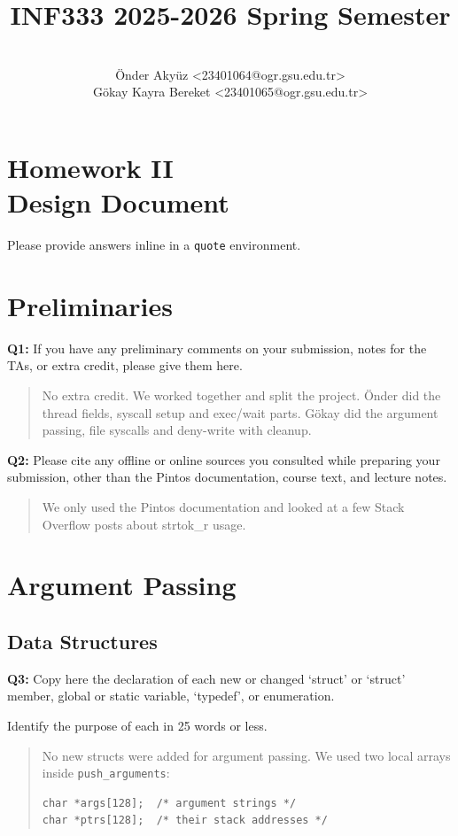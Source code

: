 \documentclass[a4paper,11pt]{paper}
\title{INF333 2025-2026 Spring Semester}
\author{
\textbf{\color{black}{Fanatics}} 
\\ Önder Akyüz <23401064@ogr.gsu.edu.tr>
\\ Gökay Kayra Bereket <23401065@ogr.gsu.edu.tr>}
\begin{document}
\maketitle

\section*{\LARGE Homework II \\
  Design Document}

Please provide answers inline in a \texttt{quote} environment.


\section{Preliminaries}

\textbf{Q1:} If you have any preliminary comments on your submission, notes for the TAs, or extra credit, please give them here.
\begin{quote}
No extra credit. We worked together and split the project. Önder did the thread fields, syscall setup and exec/wait parts. Gökay did the argument passing, file syscalls and deny-write with cleanup.
\end{quote}


\textbf{Q2:} Please cite any offline or online sources you consulted while preparing your
submission, other than the Pintos documentation, course text, and lecture notes.
\begin{quote}
We only used the Pintos documentation and looked at a few Stack Overflow
posts about strtok\_r usage.
\end{quote}


\section{Argument Passing}

\subsection{Data Structures}

\textbf{Q3:} Copy here the declaration of each new or changed `struct' or `struct' member, global or static variable, `typedef', or enumeration.

Identify the purpose of each in 25 words or less.
\begin{quote}
No new structs were added for argument passing. We used two local arrays
inside \texttt{push\_arguments}:
\begin{verbatim}
char *args[128];  /* argument strings */
char *ptrs[128];  /* their stack addresses */
\end{verbatim}
\end{quote}
\end{document}

